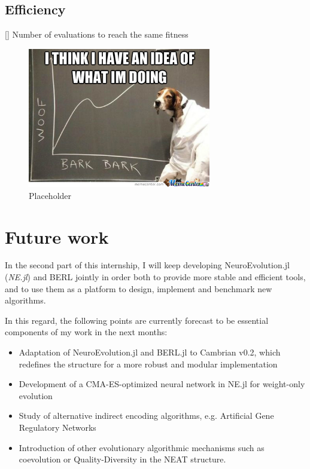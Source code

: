 \subsection{Efficiency}[]
Number of evaluations to reach the same fitness
\begin{figure}[H]
\centering
\includegraphics[width=8cm]{images/data_meme2.jpg}
\caption{Placeholder}
\end{figure}

\section{Future work}

In the second part of this internship, I will keep developing NeuroEvolution.jl (\textit{NE.jl}) and BERL jointly in order both to provide more stable and efficient tools, and to use them as a platform to design, implement and benchmark new algorithms. 

In this regard, the following points are currently forecast to be essential components of my work in the next months:
\begin{itemize}
    \item Adaptation of NeuroEvolution.jl and BERL.jl to Cambrian v0.2, which redefines the structure for a more robust and modular implementation
    \item Development of a CMA-ES-optimized neural network in NE.jl for weight-only evolution
    \item Study of alternative indirect encoding algorithms, e.g. Artificial Gene Regulatory Networks \cite{GRN}
    \item Introduction of other evolutionary algorithmic mechanisms such as coevolution or Quality-Diversity in the NEAT structure.
\end{itemize}

